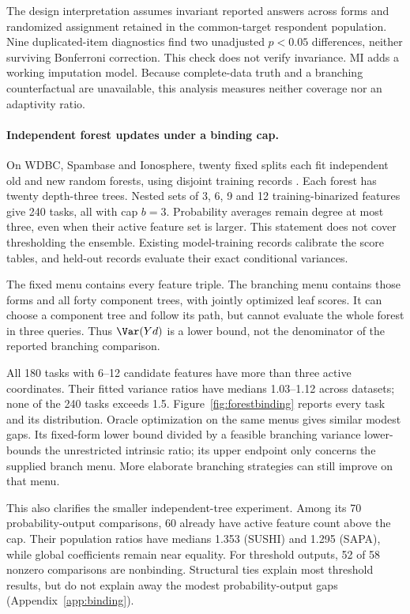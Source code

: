The design interpretation assumes invariant reported answers across forms
and randomized assignment retained in the common-target respondent
population. Nine duplicated-item diagnostics find two unadjusted
$p<0.05$ differences, neither surviving Bonferroni correction. This check
does not verify invariance. MI adds a working imputation model. Because
complete-data truth and a branching counterfactual are unavailable, this
analysis measures neither coverage nor an adaptivity ratio.

\paragraph{Independent forest updates under a binding cap.}
On WDBC, Spambase and Ionosphere, twenty fixed splits each fit independent
old and new random forests, using disjoint training records
\citep{wolberg1993,spambase1999,ionosphere1989}. Each forest has twenty
depth-three trees. Nested sets of 3, 6, 9 and 12 training-binarized features
give 240 tasks, all with cap $b=3$. Probability averages remain degree at
most three, even when their active feature set is larger. This statement
does not cover thresholding the ensemble. Existing model-training records
calibrate the score tables, and held-out records evaluate their exact
conditional variances.

The fixed menu contains every feature triple. The branching menu contains
those forms and all forty component trees, with jointly optimized leaf
scores. It can choose a component tree and follow its path, but cannot
evaluate the whole forest in three queries. Thus $\Var(Yd)$ is a lower
bound, not the denominator of the reported branching comparison.



All 180 tasks with 6--12 candidate features have more than three active
coordinates. Their fitted variance ratios have medians 1.03--1.12 across
datasets; none of the 240 tasks exceeds 1.5. Figure~\ref{fig:forestbinding}
reports every task and its distribution. Oracle optimization on the same
menus gives similar modest gaps. Its fixed-form lower bound divided by a
feasible branching variance lower-bounds the unrestricted intrinsic ratio;
its upper endpoint only concerns the supplied branch menu. More elaborate
branching strategies can still improve on that menu.

This also clarifies the smaller independent-tree experiment. Among its
70 probability-output comparisons, 60 already have active feature count
above the cap. Their population ratios have medians 1.353 (SUSHI) and
1.295 (SAPA), while global coefficients remain near equality. For
threshold outputs, 52 of 58 nonzero comparisons are nonbinding. Structural
ties explain most threshold results, but do not explain away the modest
probability-output gaps (Appendix~\ref{app:binding}).

